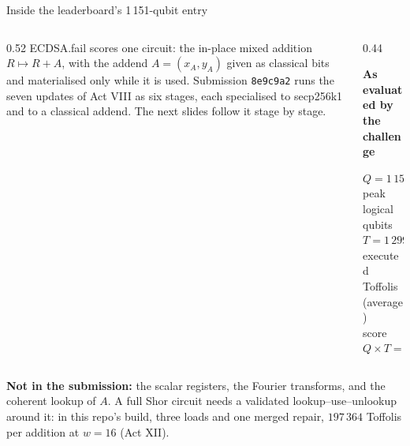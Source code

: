 \documentclass[aspectratio=169,11pt]{beamer}
\newcommand{\peachtitle}[1]{{\bfseries\color{cverm}#1}\par\vskip1mm}
\begin{document}
\begin{frame}{Inside the leaderboard's 1\,151-qubit entry}
  \begin{columns}[T]
    \begin{column}{0.52\textwidth}
      \small ECDSA.fail scores one circuit: the in-place mixed addition $R\mapsto R+A$, with the addend $A=(x_A,y_A)$ given as classical bits and materialised only while it is used.
      \vskip2mm
      Submission \texttt{8e9c9a2} runs the seven updates of Act VIII as six stages, each specialised to secp256k1 and to a classical addend. The next slides follow it stage by stage.
    \end{column}
    \begin{column}{0.44\textwidth}
      \begin{peachblock}[fontupper=\small]\peachtitle{As evaluated by the challenge}
        $Q=1\,151$ peak logical qubits\\
        $T=1\,299\,453$ executed Toffolis (average)\\
        score $Q\times T=1\,495\,670\,403$
      \end{peachblock}
    \end{column}
  \end{columns}
  \vskip2mm
  \begin{greyblock}[fontupper=\small]
    \textbf{Not in the submission:} the scalar registers, the Fourier transforms, and the coherent lookup of $A$. A full Shor circuit needs a validated lookup--use--unlookup around it: in this repo's build, three loads and one merged repair, $197\,364$ Toffolis per addition at $w=16$ (Act XII).
  \end{greyblock}
\end{frame}
\end{document}
